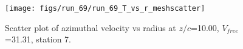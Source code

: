 \begin{figure}[H]
\centering
\texttt{[image: figs/run\_69/run\_69\_T\_vs\_r\_meshscatter]}
\caption{Scatter plot of azimuthal velocity vs radius at $z/c$=10.00, $V_{free}$=31.31, station 7.}
\label{fig:run_69_T_vs_r_meshscatter}
\end{figure}


